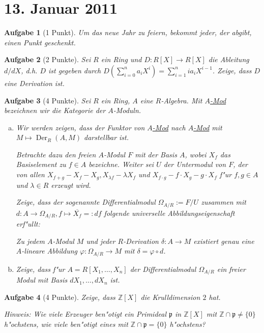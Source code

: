 \documentclass[a4paper, 12pt, numbers=noendperiod, chapterprefix=true]{scrbook}
\theoremstyle{break}
\newtheorem{Aufg}{Aufgabe}
\theoremstyle{nonumberbreak}
\theoremstyle{nonumberplain}
\DeclareMathOperator{\Der}{Der}
\newcommand{\Z}{\mathbb{Z}}
\newcommand{\p}{\mathfrak{p}}
\begin{document}
\newpage
\section{13. Januar 2011}
\setcounter{Aufg}{-1}
\setcounter{Loes}{2}

\begin{Aufg}[1 Punkt]
Um das neue Jahr zu feiern, bekommt jeder, der abgibt, einen Punkt geschenkt.
\end{Aufg}

\begin{Aufg}[2 Punkte]
Sei $R$ ein Ring und $D\colon R[X] \to R[X]$ die Ableitung $d/dX$, d.h. $D$ ist gegeben durch $D(\sum_{i=0}^n a_i X^i) = \sum_{i=1}^n i a_i X^{i-1}$. Zeige, dass $D$ eine Derivation ist.
\end{Aufg}

\begin{Aufg}[4 Punkte]
Sei $R$ ein Ring, $A$ eine $R$-Algebra. Mit \underline{$A$-Mod} bezeichnen wir die Kategorie der $A$-Moduln.
\begin{enumerate}[a)]
\item
	Wir werden zeigen, dass der Funktor von \underline{$A$-Mod} nach \underline{$A$-Mod} mit $M \mapsto \Der_R(A,M)$ darstellbar ist.

	Betrachte dazu den freien $A$-Modul $F$ mit der Basis $A$, wobei $X_f$ das Basiselement zu $f \in A$ bezeichne. Weiter sei $U$ der Untermodul von $F$, der von allen $X_{f+g} - X_f - X_g, X_{\lambda f} - \lambda X_f$ und $X_{f \cdot g} - f \cdot X_g - g \cdot X_f$ f"ur $f,g \in A$ und $\lambda \in R$ erzeugt wird. 

	Zeige, dass der sogenannte \emph{Differentialmodul} $\Omega_{A/R} := F/U$ zusammen mit $d \colon A \to \Omega_{A/R}, f \mapsto \overline{X_f} =: df$ folgende universelle Abbildungseigenschaft erf"ullt:

	Zu jedem $A$-Modul $M$ und jeder $R$-Derivation $\delta\colon A \to M$ existiert genau eine $A$-lineare Abbildung $\varphi \colon \Omega_{A/R} \to M$ mit $\delta = \varphi \circ d$.
\item
	Zeige, dass f"ur $A= R[X_1, \dots, X_n]$ der Differentialmodul $\Omega_{A/R}$ ein freier Modul mit Basis $dX_1, \dots, dX_n$ ist.
\end{enumerate}\end{Aufg}

\begin{Aufg}[4 Punkte]
Zeige, dass $\Z[X]$ die Krulldimension $2$ hat.

\emph{Hinweis: Wie viele Erzeuger ben"otigt ein Primideal $\p$ in $\Z[X]$ mit $\Z \cap \p \neq \{0\}$ h"ochstens, wie viele ben"otigt eines mit $\Z \cap \p = \{0\}$ h"ochstens?}
\end{Aufg}
\end{document}
